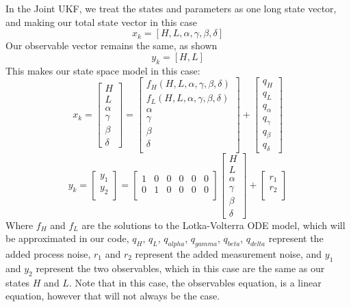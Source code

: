 In the Joint UKF, we treat the states and parameters as one long state vector, and making our total state vector in this case
$$x_k = [H, L, \alpha, \gamma, \beta, \delta]$$
Our observable vector remains the same, as shown
$$y_k = [H, L]$$
This makes our state space model in this case:
$$x_k = \begin{bmatrix}
H\\
L\\
\alpha\\
\gamma\\
\beta\\
\delta
\end{bmatrix} = \begin{bmatrix}
f_H(H,L,\alpha, \gamma, \beta, \delta)\\
f_L(H,L,\alpha, \gamma, \beta, \delta)\\
\alpha\\
\gamma\\
\beta\\
\delta\\
\end{bmatrix} + \begin{bmatrix}
q_H\\
q_L\\
q_{\alpha}\\
q_{\gamma}\\
q_{\beta}\\
q_{\delta}
\end{bmatrix}$$
$$y_k = \begin{bmatrix}
y_1\\
y_2\\
\end{bmatrix} = 
\begin{bmatrix}
1 & 0 & 0 & 0 & 0 & 0\\
0 & 1 & 0 & 0 & 0 & 0\\
\end{bmatrix}
\begin{bmatrix}
H\\
L\\
\alpha\\
\gamma\\
\beta\\
\delta
\end{bmatrix}+
\begin{bmatrix}
r_1\\
r_2\\
\end{bmatrix}$$
Where $f_H$ and $f_L$ are the solutions to the Lotka-Volterra ODE model, which will be approximated in our code, $q_H$, $q_L$, $q_{alpha}$, $q_{gamma}$, $q_{beta}$, $q_{delta}$ represent the added process noise, $r_1$ and $r_2$ represent the added measurement noise, and $y_1$ and $y_2$ represent the two observables, which in this case are the same as our states $H$ and $L$. Note that in this case, the observables equation, is a linear equation, however that will not always be the case. 

